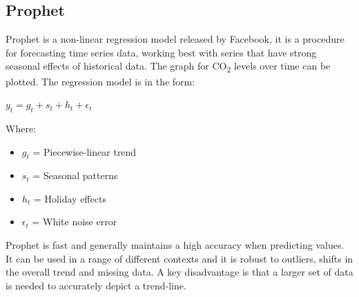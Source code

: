 \documentclass[12pt]{mcmthesis}
\begin{document}
    \subsection{Prophet}
    Prophet is a non-linear regression model released by Facebook, it is a procedure for forecasting time series data, working best with series that have strong seasonal effects of historical data. The graph for CO\textsubscript{2} levels over time can be plotted. The regression model is in the form:

    ${\displaystyle y_t = g_t + s_t + h_t +\epsilon_t}$

    Where:
    \begin{itemize}
        \item ${g_t}$ = Piecewise-linear trend
        \item ${s_t}$ = Seasonal patterns
        \item ${h_t}$ = Holiday effects
        \item ${\epsilon_t}$ = White noise error
    \end{itemize}

    \begin{center}
    \end{center}

    Prophet is fast and generally maintains a high accuracy when predicting values. It can be used in a range of different contexts and it is robust to outliers, shifts in the overall trend and missing data. A key disadvantage is that a larger set of data is needed to accurately depict a trend-line.
\end{document}
